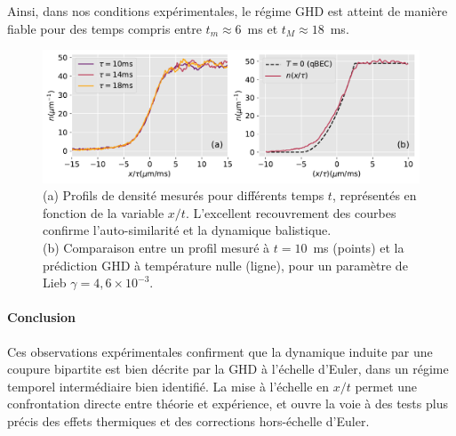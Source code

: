 Ainsi, dans nos conditions expérimentales, le régime GHD est atteint de manière fiable pour des temps compris entre $t_m \approx 6$~ms et $t_M \approx 18$~ms.

%
%

\begin{figure}[!htb]
\centering
\includegraphics[width=1.0\linewidth]{figures/06_Bipart/DWD_GPE_vs_exp_V2.pdf}
\caption{
(a) Profils de densité mesurés pour différents temps $t$, représentés en fonction de la variable $x/t$. L’excellent recouvrement des courbes confirme l’auto-similarité et la dynamique balistique.\\
(b) Comparaison entre un profil mesuré à $t = 10$~ms (points) et la prédiction GHD à température nulle (ligne), pour un paramètre de Lieb $\gamma = 4{,}6 \times 10^{-3}$.
}
\label{fig:euler}
\end{figure}

\paragraph{Conclusion}

Ces observations expérimentales confirment que la dynamique induite par une coupure bipartite est bien décrite par la GHD à l’échelle d’Euler, dans un régime temporel intermédiaire bien identifié. La mise à l’échelle en $x/t$ permet une confrontation directe entre théorie et expérience, et ouvre la voie à des tests plus précis des effets thermiques et des corrections hors-échelle d’Euler.

